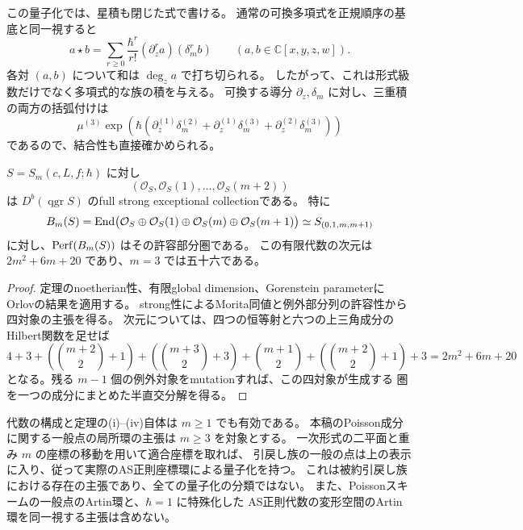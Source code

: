 この量子化では、星積も閉じた式で書ける。
通常の可換多項式を正規順序の基底と同一視すると
\[
 a\star b=\sum_{r\ge0}\frac{\hbar^r}{r!}
              (\partial_z^r a)(\delta_m^r b)
 \qquad(a,b\in\mathbb C[x,y,z,w]).
\]
各対 $(a,b)$ について和は $\deg_z a$ で打ち切られる。
したがって、これは形式級数だけでなく多項式的な族の積を与える。
可換する導分 $\partial_z,\delta_m$ に対し、三重積の両方の括弧付けは
\[
 \mu^{(3)}\exp\!\left(\hbar(
 \partial_z^{(1)}\delta_m^{(2)}+
 \partial_z^{(1)}\delta_m^{(3)}+
 \partial_z^{(2)}\delta_m^{(3)})\right)
\]
であるので、結合性も直接確かめられる。

\begin{corollary}[標準例外列と四対象の許容成分]
\label{cor:pullback-exceptional-v33}
$S=S_m(c,L,f;\hbar)$ に対し
\[
 (\mathcal O_S,\mathcal O_S(1),\ldots,\mathcal O_S(m+2))
\]
は $D^b(\operatorname{qgr}S)$ のfull strong exceptional collectionである。
特に
\[
 B_m(S)=\operatorname{End}\bigl(\mathcal O_S\oplus\mathcal O_S(1)
             \oplus\mathcal O_S(m)\oplus\mathcal O_S(m+1)\bigr)
       \simeq S_{(0,1,m,m+1)}
\]
に対し、$\operatorname{Perf}(B_m(S))$ はその許容部分圏である。
この有限代数の次元は $2m^2+6m+20$ であり、$m=3$ では五十六である。
\end{corollary}

\begin{proof}
定理のnoetherian性、有限global dimension、Gorenstein parameterに
Orlovの結果\cite[Corollary 2.7]{Orlov2009}を適用する。
strong性によるMorita同値と例外部分列の許容性から四対象の主張を得る。
次元については、四つの恒等射と六つの上三角成分のHilbert関数を足せば
\[
 4+3+\left(\binom{m+2}{2}+1\right)
 +\left(\binom{m+3}{2}+3\right)
 +\binom{m+1}{2}+\left(\binom{m+2}{2}+1\right)+3
 =2m^2+6m+20
\]
となる。残る $m-1$ 個の例外対象をmutationすれば、この四対象が生成する
圏を一つの成分にまとめた半直交分解を得る。
\end{proof}

\begin{remark}[量子化の範囲]
代数の構成と定理の\textup{(i)--(iv)}自体は $m\ge1$ でも有効である。
本稿のPoisson成分に関する一般点の局所環の主張は $m\ge3$ を対象とする。
一次形式の二平面と重み $m$ の座標の移動を用いて適合座標を取れば、
引戻し族の一般の点は上の表示に入り、従って実際のAS正則座標環による量子化を持つ。
これは被約引戻し族における存在の主張であり、全ての量子化の分類ではない。
また、Poissonスキームの一般点のArtin環と、$\hbar=1$ に特殊化した
AS正則代数の変形空間のArtin環を同一視する主張は含めない。
\end{remark}
